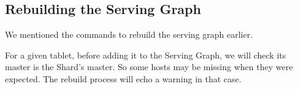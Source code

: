 \subsection{Rebuilding the Serving Graph}\hypertarget{rebuilding-the-serving-graph}{}\label{rebuilding-the-serving-graph}

We mentioned the commands to rebuild the serving graph earlier.

For a given tablet, before adding it to the Serving Graph, we will check its master is the Shard's master. So some hosts
may be missing when they were expected. The rebuild process will echo a warning in that case.

